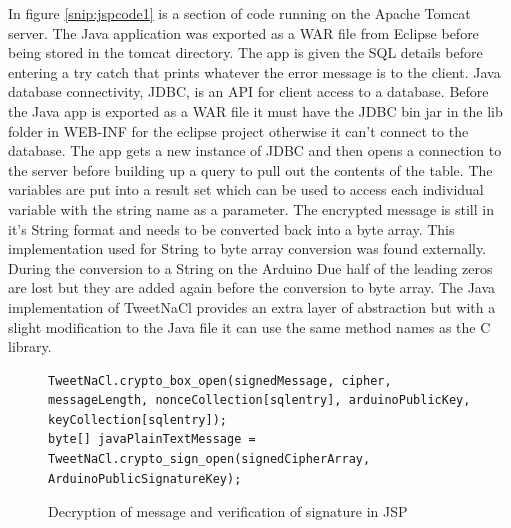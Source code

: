 In figure \ref{snip:jspcode1} is a section of code running on the Apache Tomcat server. The Java application was exported as a WAR file from Eclipse before being stored in the tomcat directory. The app is given the SQL details before entering a try catch that prints whatever the error message is to the client. Java database connectivity, JDBC, is an API for client access to a database. Before the Java app is exported as a WAR file it must have the JDBC bin jar in the lib folder in WEB-INF for the eclipse project otherwise it can't connect to the database\cite{jdbc}. The app gets a new instance of JDBC and then opens a connection to the server before building up a query to pull out the contents of the table. The variables are put into a result set which can be used to access each individual variable with the string name as a parameter. The encrypted message is still in it's String format and needs to be converted back into a byte array. This implementation used for String to byte array conversion was found externally\cite{byte2}. During the conversion to a String on the Arduino Due half of the leading zeros are lost but they are added again before the conversion to byte array. The Java implementation of TweetNaCl provides an extra layer of abstraction but with a slight modification to the Java file it can use the same method names as the C library.

\begin{figure}[H]
\begin{lstlisting}[style=Java]
TweetNaCl.crypto_box_open(signedMessage, cipher, messageLength, nonceCollection[sqlentry], arduinoPublicKey, keyCollection[sqlentry]);
byte[] javaPlainTextMessage = TweetNaCl.crypto_sign_open(signedCipherArray, ArduinoPublicSignatureKey);
\end{lstlisting}
\caption{Decryption of message and verification of signature in JSP}
\label{snip:decryptjsp}
\end{figure}

